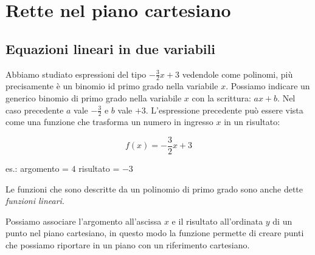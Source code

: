 


\chapter{Rette nel piano cartesiano}

\section{Equazioni lineari in due variabili}
\label{sec:retta_equazionilineari}

Abbiamo studiato espressioni del tipo \(-\frac{3}{2}x+3\) vedendole come 
polinomi, più precisamente è un binomio id primo grado nella variabile \(x\).
Possiamo indicare un generico binomio di primo grado nella variabile \(x\) 
con la scrittura: \(ax+b\).
Nel caso precedente \(a\) vale \(-\frac{3}{2}\) e \(b\) vale \(+3\).
L'espressione precedente può essere vista come una funzione che trasforma un 
numero in ingresso \(x\) in un risultato:

\begin{minipage}{.49\textwidth}
\[f(x)=-\frac{3}{2}x+3\]
\end{minipage}
\hfill
\begin{minipage}{.49\textwidth}
es.: \quad argomento = \(4\) \quad risultato = \(-3\)
\begin{center}
\end{center}
\end{minipage}

Le funzioni che sono descritte da un polinomio di primo grado sono anche 
dette \emph{funzioni lineari}.

Possiamo associare l'argomento all'ascissa \(x\) e il risultato all'ordinata 
\(y\) di un punto nel piano cartesiano, in questo modo la funzione permette 
di creare punti che possiamo riportare in un piano con un riferimento 
cartesiano.

